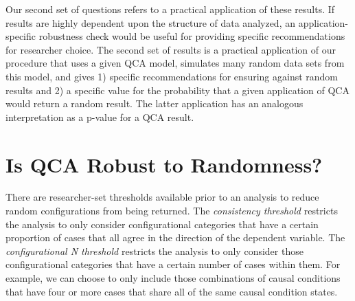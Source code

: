 \documentclass[12pt]{article}
\begin{document}
{{{{Our second set of questions refers to a practical application of these results. If results are highly dependent upon the structure of data analyzed, an application-specific robustness check would be useful for providing specific recommendations for researcher choice. The second set of results is a practical application of our procedure that uses a given QCA model, simulates many random data sets from this model, and gives 1) specific recommendations for ensuring against random results and 2) a specific value for the probability that a given application of QCA would return a random result. The latter application has an analogous interpretation as a p-value for a QCA result. 






\section{Is QCA Robust to Randomness?}


There are researcher-set thresholds available prior to an analysis to reduce random configurations from being returned. The {\it{consistency threshold}} restricts the analysis to only consider configurational categories that have a certain proportion of cases that all agree in the direction of the dependent variable. The {\it{configurational N threshold}} restricts the analysis to only consider those configurational categories that have a certain number of cases within them. For example, we can choose to only include those combinations of causal conditions that have four or more cases that share all of the same causal condition states.

}}}}
\end{document}

